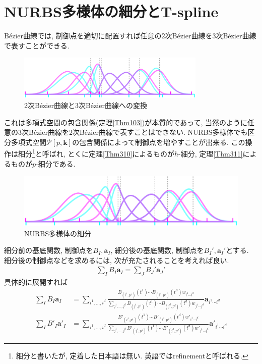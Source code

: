 \documentclass{jsarticle}
\theoremstyle{definition}%
\begin{document}
\section{NURBS多様体の細分とT-spline}
B\'{e}zier曲線では, 制御点を適切に配置すれば任意の$2$次B\'{e}zier曲線を$3$次B\'{e}zier曲線で表すことができる.
\begin{figure}[H]
	\centering
    \includegraphics[page=3,clip,width=90mm]{figA.pdf}
    \caption{2次B\'{e}zier曲線と$3$次B\'{e}zier曲線への変換}
	\label{Fig601}
\end{figure}
これは多項式空間の包含関係(定理\ref{Thm103})が本質的であって, 当然のように任意の$3$次B\'{e}zier曲線を$2$次B\'{e}zier曲線で表すことはできない.
NURBS多様体でも区分多項式空間$\mathcal{P}[p,\bm{k}]$の包含関係によって制御点を増やすことが出来る.
この操作は細分\footnote{細分と書いたが, 定着した日本語は無い. 英語ではrefinementと呼ばれる.}と呼ばれ, とくに定理\ref{Thm310}によるものが$h$-細分, 定理\ref{Thm311}によるものが$p$-細分である.
\begin{figure}[H]
	\centering
    \includegraphics[page=11,clip,width=150mm]{figA.pdf}
    \caption{NURBS多様体の細分}
	\label{Fig602}
\end{figure}
細分前の基底関数, 制御点を$B_I, \bm{a}_I$, 細分後の基底関数, 制御点を$B_I', \bm{a}_I'$とする.
細分後の制御点などを求めるには, 次が充たされることを考えれば良い.
\begin{align}
    \sum_I B_I\bm{a}_I
    =\sum_J B_J'\bm{a}_J'
\end{align}
具体的に展開すれば
\begin{align}
    \sum_I B_I\bm{a}_I
    &=\sum_{i^1,\dots,i^d} \frac{B_{(i^1,p^1)}(t^1)\cdots B_{(i^d,p^d)}(t^d)w_{i^1\cdots i^d}}{\sum\limits_{j^1,\dots,j^d}B_{(j^1,p^1)}(t^1)\cdots B_{(j^d,p^d)}(t^d)w_{j^1\cdots j^d}}\bm{a}_{i^1\cdots i^d} \\
    \sum_I B'_I\bm{a}'_I
    &=\sum_{i^1,\dots,i^d} \frac{B'_{(i^1,p^1)}(t^1)\cdots B'_{(i^d,p^d)}(t^d)w'_{i^1\cdots i^d}}{\sum\limits_{j^1,\dots,j^d}B'_{(j^1,p^1)}(t^1)\cdots B'_{(j^d,p^d)}(t^d)w'_{j^1\cdots j^d}}\bm{a}'_{i^1\cdots i^d}
\end{align}
\end{document}
